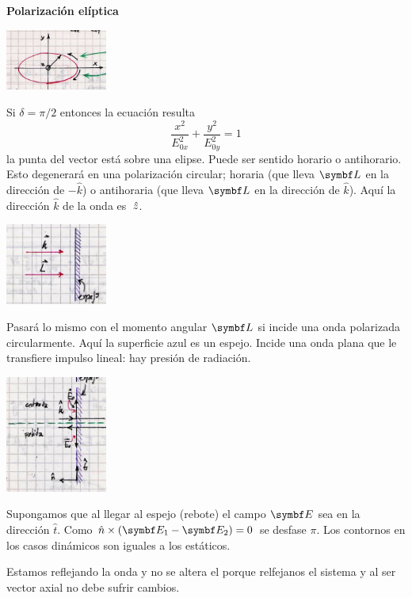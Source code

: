 \documentclass[10pt,oneside]{CBFT_book}
\begin{document}
\begin{ejemplo}{\bf Polarización elíptica}

\includegraphics[width=0.25\textwidth]{images/fig_ft1_ondas_polarizacion_eliptica.jpg} 

Si $\delta = \pi/2$ entonces la ecuación resulta 
\[
	\frac{x^2}{E^2_{0x}} + \frac{y^2}{E^2_{0y}} = 1
\]
la punta del vector está sobre una elipse.
Puede ser sentido horario o antihorario.
Esto degenerará en una polarización circular; horaria (que lleva $\vb{L}$ en la dirección de $-\hat{k}$)
o antihoraria (que lleva $\vb{L}$ en la dirección de $\hat{k}$). Aquí la dirección $\hat{k}$ de la onda
es $\:\hat{z}$.

\includegraphics[width=0.25\textwidth]{images/fig_ft1_ondas_polarizacion_espejo.jpg} 

Pasará lo mismo con el momento angular $\vb{L}$ si incide una onda polarizada circularmente.
Aquí la superficie azul es un espejo. Incide una onda plana que le transfiere impulso lineal: hay presión
de radiación.

\includegraphics[width=0.25\textwidth]{images/fig_ft1_ondas_polarizacion_espejo2.jpg} 

Supongamos que al llegar al espejo (rebote) el campo $\vb{E}$ sea en la dirección $\hat{t}$.
Como $ \hat{n} \times (\vb{E}_1 - \vb{E}_2 ) = 0$ se desfase $\pi$.
Los contornos en los casos dinámicos son iguales a los estáticos.

Estamos reflejando la onda y no se altera el  porque relfejanos el sistema y al ser  vector axial
no debe sufrir cambios.
 
\end{ejemplo}
\end{document}
